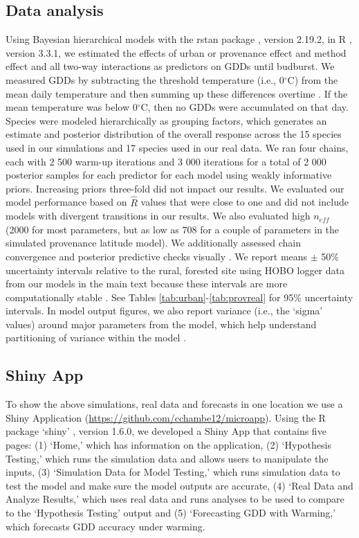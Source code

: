 \documentclass{article}\usepackage[]{graphicx}\usepackage[]{color}
\begin{document}
\subsection*{Data analysis}
Using Bayesian hierarchical models with the rstan package \citep{rstan2019}, version 2.19.2,  in R \citep{R}, version 3.3.1, we estimated the effects of urban or provenance effect and method effect and all two-way interactions as predictors on GDDs until budburst. We measured GDDs by subtracting the threshold temperature (i.e., 0$^{\circ}$C) from the mean daily temperature and then summing up these differences overtime \citep{Asse2018}. If the mean temperature was below 0$^{\circ}$C, then no GDDs were accumulated on that day. Species were modeled hierarchically as grouping factors, which generates an estimate and posterior distribution of the overall response across the 15 species used in our simulations and 17 species used in our real data. We ran four chains, each with 2 500 warm-up iterations and 3 000 iterations for a total of 2 000 posterior samples for each predictor for each model using weakly informative priors. Increasing priors three-fold did not impact our results. We evaluated our model performance based on $\hat{R}$ values that were close to one and did not include models with divergent transitions in our results. We also evaluated high $n_{eff}$ (2000 for most parameters, but as low as 708 for a couple of parameters in the simulated provenance latitude model). We additionally assessed chain convergence and posterior predictive checks visually \citep{BDA}. We report means $\pm$ 50\% uncertainty intervals relative to the rural, forested site using HOBO logger data from our models in the main text because these intervals are more computationally stable \citep{BDA,Carpenter2017}. See Tables \ref{tab:urban}-\ref{tab:provreal} for 95\% uncertainty intervals. In model output figures, we also report variance (i.e., the `sigma' values) around major parameters from the model, which help understand partitioning of variance within the model \citep{BDA}. 

\subsection*{Shiny App}
To show the above simulations, real data and forecasts in one location we use a Shiny Application (\url{https://github.com/cchambe12/microapp}). Using the R package `shiny' \citep{shiny2021}, version 1.6.0, we developed a Shiny App that contains five pages: (1) `Home,' which has information on the application, (2) `Hypothesis Testing,' which runs the simulation data and allows users to manipulate the inputs, (3) `Simulation Data for Model Testing,' which runs simulation data to test the model and make sure the model outputs are accurate, (4) `Real Data and Analyze Results,' which uses real data and runs analyses to be used to compare to the `Hypothesis Testing' output and (5) `Forecasting GDD with Warming,' which forecasts GDD accuracy under warming. 
\end{document}

